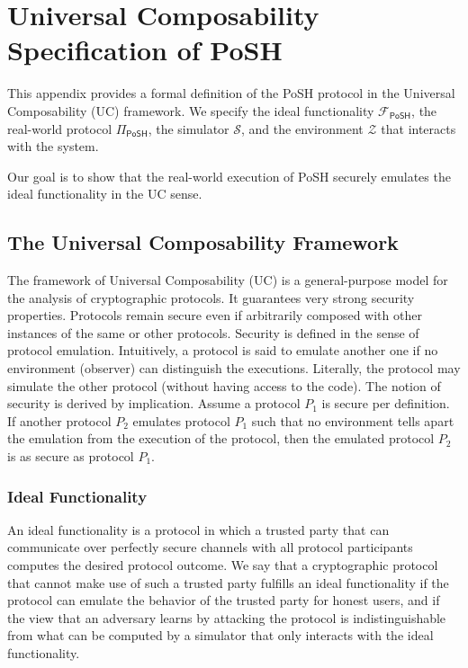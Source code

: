 \documentclass{article}
\begin{document}
\section{Universal Composability Specification of PoSH}

This appendix provides a formal definition of the PoSH protocol in the Universal
Composability (UC) framework. We specify the ideal functionality
$\mathcal{F}_{\textsf{PoSH}}$, the real-world protocol $\Pi_{\textsf{PoSH}}$,
the simulator $\mathcal{S}$, and the environment $\mathcal{Z}$ that interacts
with the system.

Our goal is to show that the real-world execution of PoSH securely emulates the
ideal functionality in the UC sense.

\subsection{The Universal Composability Framework}

The framework of Universal Composability (UC) \cite{Canetti01} is a general-purpose model for the
analysis of cryptographic protocols. It guarantees very strong security
properties. Protocols remain secure even if arbitrarily composed with other
instances of the same or other protocols. Security is defined in the sense of
protocol emulation. Intuitively, a protocol is said to emulate another one if no
environment (observer) can distinguish the executions. Literally, the protocol
may simulate the other protocol (without having access to the code). The notion
of security is derived by implication. Assume a protocol $P_1$ is secure per
definition. If another protocol $P_2$ emulates protocol $P_1$ such that no
environment tells apart the emulation from the execution of the protocol, then
the emulated protocol $P_2$ is as secure as protocol $P_1$.

\subsubsection{Ideal Functionality}

An ideal functionality is a protocol in which a trusted party that can
communicate over perfectly secure channels with all protocol participants
computes the desired protocol outcome. We say that a cryptographic protocol that
cannot make use of such a trusted party fulfills an ideal functionality if the
protocol can emulate the behavior of the trusted party for honest users, and if
the view that an adversary learns by attacking the protocol is indistinguishable
from what can be computed by a simulator that only interacts with the ideal
functionality.
\end{document}
